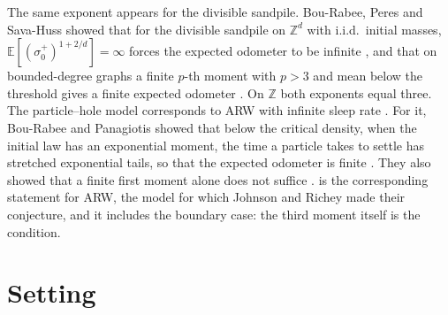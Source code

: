 \documentclass[11pt]{article}
\theoremstyle{remark}
\newcommand{\Z}{\mathbb Z}
\newcommand{\E}{\mathbb E}
\newcommand{\1}{\mathbf 1}
\begin{document}
The same exponent appears for the divisible sandpile. Bou-Rabee, Peres and Sava-Huss \cite{BPS} showed that for the divisible sandpile on $\Z^d$ with i.i.d.\ initial masses, $\E[(\sigma_0^+)^{1+2/d}]=\infty$ forces the expected odometer to be infinite \cite[Lemma~8.2]{BPS}, and that on bounded-degree graphs a finite $p$-th moment with $p>3$ and mean below the threshold gives a finite expected odometer \cite[Theorem~1.3]{BPS}. On $\Z$ both exponents equal three. The particle--hole model corresponds to ARW with infinite sleep rate \cite[Section~10.3]{Ro}. For it, Bou-Rabee and Panagiotis \cite{BP} showed that below the critical density, when the initial law has an exponential moment, the time a particle takes to settle has stretched exponential tails, so that the expected odometer is finite \cite[Theorem~1.1]{BP}. They also showed that a finite first moment alone does not suffice \cite[Remark~9.6]{BP}.  is the corresponding statement for ARW, the model for which Johnson and Richey made their conjecture, and it includes the boundary case: the third moment itself is the condition.

\section{Setting}\label{sec:setting}
\end{document}
